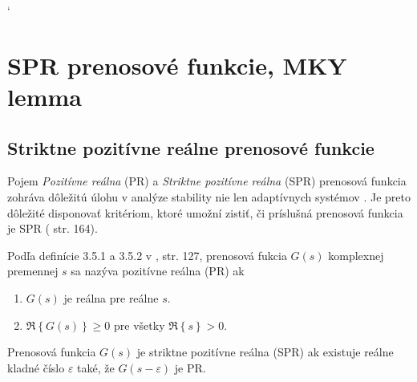 \documentclass[a4paper, 10pt, ]{article}
\begin{document}
{\catcode`

}








































\section{SPR prenosové funkcie, MKY lemma}



\subsection{Striktne pozitívne reálne prenosové funkcie}


Pojem \emph{Pozitívne reálna} (PR) a \emph{Striktne pozitívne reálna} (SPR) prenosová funkcia zohráva dôležitú úlohu v analýze stability nie len adaptívnych systémov \cite{Ioannou2006}. Je preto dôležité disponovať kritériom, ktoré umožní zistiť, či príslušná prenosová funkcia je SPR (\cite{Murgas1993} str. 164).

Podľa definície 3.5.1 a 3.5.2 v \cite{Ioannou2006}, str. 127, prenosová fukcia $G(s)$ komplexnej premennej $s$ sa nazýva pozitívne reálna (PR) ak
\begin{enumerate}
	\item $G(s)$ je reálna pre reálne $s$.
	\item $\Re \left\{ G(s) \right\} \geq 0$ pre všetky $\Re \left\{ s \right\} > 0$.
\end{enumerate}
Prenosová funkcia $G(s)$ je striktne pozitívne reálna (SPR) ak existuje reálne kladné číslo $\varepsilon$ také, že $G(s - \varepsilon)$ je PR.
\end{document}
